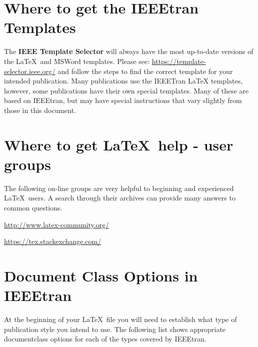 \documentclass[lettersize,journal]{IEEEtran} %
\begin{document}
  


  

\section{Where to get the IEEEtran Templates}
\noindent The {\bf{IEEE Template Selector}} will always have the most up-to-date versions of the \LaTeX\ and MSWord templates. Please see: \url{https://template-selector.ieee.org/} and follow the steps to find the correct template for your intended publication. Many publications use the IEEETran LaTeX templates, however, some publications have their own special templates. Many of these are  based on IEEEtran, but may have special instructions that vary slightly from those in this document.

\section{Where to get \LaTeX \ help - user groups}
\noindent The following on-line groups are very helpful to beginning and experienced \LaTeX\ users. A search through their archives can provide many answers to common questions.
\begin{list}{}{}
\item{\url{http://www.latex-community.org/}} 
\item{\url{https://tex.stackexchange.com/} }
\end{list}

\section{Document Class Options in IEEEtran}
\noindent At the beginning of your \LaTeX\ file you will need to establish what type of publication style you intend to use. The following list shows appropriate documentclass options for each of the types covered by IEEEtran.
\end{document}
